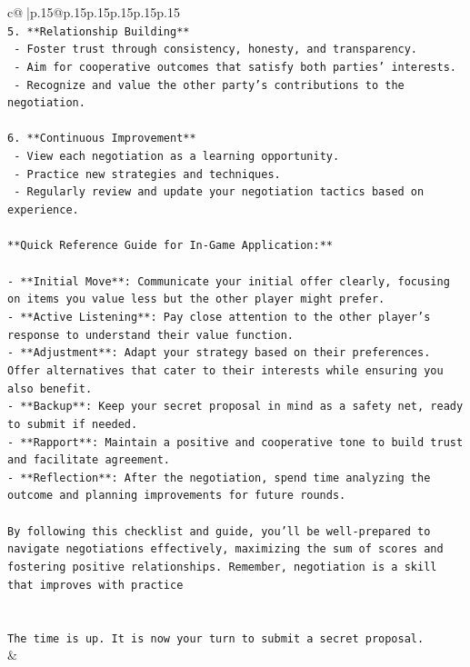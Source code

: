 \documentclass{article}
\begin{document}
{\begin{supertabular}{c@{$\;$}|p{.15\linewidth}@{}p{.15\linewidth}p{.15\linewidth}p{.15\linewidth}p{.15\linewidth}p{.15\linewidth}}
{{{\\ 
\texttt{5. **Relationship Building**} \\
\texttt{   {-} Foster trust through consistency, honesty, and transparency.} \\
\texttt{   {-} Aim for cooperative outcomes that satisfy both parties' interests.} \\
\texttt{   {-} Recognize and value the other party's contributions to the negotiation.} \\
\\ 
\texttt{6. **Continuous Improvement**} \\
\texttt{   {-} View each negotiation as a learning opportunity.} \\
\texttt{   {-} Practice new strategies and techniques.} \\
\texttt{   {-} Regularly review and update your negotiation tactics based on experience.} \\
\\ 
\texttt{**Quick Reference Guide for In{-}Game Application:**} \\
\\ 
\texttt{{-} **Initial Move**: Communicate your initial offer clearly, focusing on items you value less but the other player might prefer.} \\
\texttt{{-} **Active Listening**: Pay close attention to the other player's response to understand their value function.} \\
\texttt{{-} **Adjustment**: Adapt your strategy based on their preferences. Offer alternatives that cater to their interests while ensuring you also benefit.} \\
\texttt{{-} **Backup**: Keep your secret proposal in mind as a safety net, ready to submit if needed.} \\
\texttt{{-} **Rapport**: Maintain a positive and cooperative tone to build trust and facilitate agreement.} \\
\texttt{{-} **Reflection**: After the negotiation, spend time analyzing the outcome and planning improvements for future rounds.} \\
\\ 
\texttt{By following this checklist and guide, you'll be well{-}prepared to navigate negotiations effectively, maximizing the sum of scores and fostering positive relationships. Remember, negotiation is a skill that improves with practice} \\
\\ 
\\ 
\texttt{The time is up. It is now your turn to submit a secret proposal.} \\
            }
        }
    }
    & \\ \\


\end{supertabular}}
\end{document}
